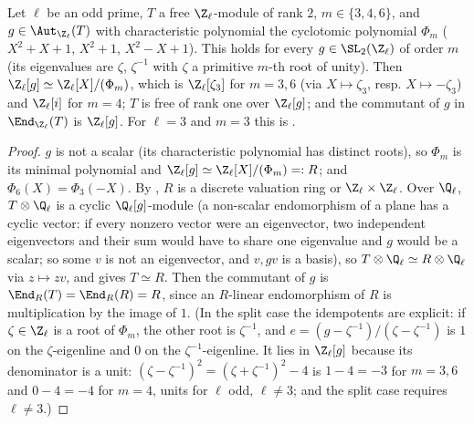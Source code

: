 \begin{proposition}\label{prop:ant:latticefree}
Let $\ell$ be an odd prime, $T$ a free $\Z_\ell$-module of rank $2$, $m\in\{3,4,6\}$, and $g\in\Aut_{\Z_\ell}(T)$ with characteristic polynomial the
cyclotomic polynomial $\Phi_m$ ($X^2+X+1$, $X^2+1$, $X^2-X+1$). This holds for every $g\in\SL_2(\Z_\ell)$ of order $m$ (its eigenvalues are $\zeta$, $\zeta^{-1}$
with $\zeta$ a primitive $m$-th root of unity). Then $\Z_\ell[g]\simeq\Z_\ell[X]/(\Phi_m)$, which is $\Z_\ell[\zeta_3]$ for $m=3,6$ (via $X\mapsto\zeta_3$,
resp. $X\mapsto-\zeta_3$) and $\Z_\ell[i]$ for $m=4$; $T$ is free of rank one over $\Z_\ell[g]$; and the commutant of $g$ in $\End_{\Z_\ell}(T)$ is $\Z_\ell[g]$.
For $\ell=3$ and $m=3$ this is .
\end{proposition}

\begin{proof}
$g$ is not a scalar (its characteristic polynomial has distinct roots), so $\Phi_m$ is its minimal polynomial and $\Z_\ell[g]\simeq\Z_\ell[X]/(\Phi_m)=:R$; and
$\Phi_6(X)=\Phi_3(-X)$. By , $R$ is a discrete valuation ring or $\Z_\ell\times\Z_\ell$. Over $\Q_\ell$, $T\otimes\Q_\ell$ is a cyclic
$\Q_\ell[g]$-module (a non-scalar endomorphism of a plane has a cyclic vector: if every nonzero vector were an eigenvector, two independent eigenvectors and their
sum would have to share one eigenvalue and $g$ would be a scalar; so some $v$ is not an eigenvector, and $v,gv$ is a basis), so $T\otimes\Q_\ell\simeq R\otimes\Q_\ell$
via $z\mapsto zv$, and  gives $T\simeq R$. Then the commutant of $g$ is $\End_R(T)=\End_R(R)=R$, since an $R$-linear endomorphism of
$R$ is multiplication by the image of $1$. (In the split case the idempotents are explicit: if $\zeta\in\Z_\ell$ is a root of $\Phi_m$, the other root is
$\zeta^{-1}$, and $e=(g-\zeta^{-1})/(\zeta-\zeta^{-1})$ is $1$ on the $\zeta$-eigenline and $0$ on the $\zeta^{-1}$-eigenline. It lies in $\Z_\ell[g]$ because its
denominator is a unit: $(\zeta-\zeta^{-1})^2=(\zeta+\zeta^{-1})^2-4$ is $1-4=-3$ for $m=3,6$ and $0-4=-4$ for $m=4$, units for $\ell$ odd, $\ell\ne3$; and the split
case requires $\ell\ne3$.)
\end{proof}

